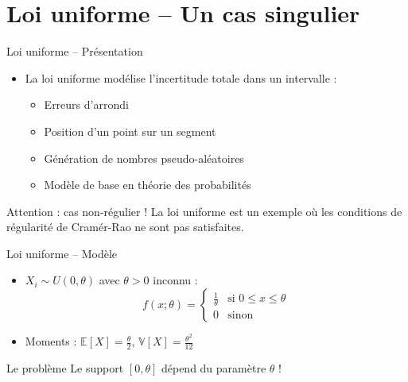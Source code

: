 \documentclass[11pt,aspectratio=169]{beamer}
\begin{document}
\section{Loi uniforme -- Un cas singulier}

\begin{frame}{Loi uniforme -- Présentation}

\begin{itemize}

\item La loi uniforme modélise l'incertitude totale dans un intervalle :\newline
  \begin{itemize}
    \item Erreurs d'arrondi\newline
    \item Position d'un point sur un segment\newline
    \item Génération de nombres pseudo-aléatoires\newline
    \item Modèle de base en théorie des probabilités\newline
  \end{itemize}

\end{itemize}

\begin{alertblock}{Attention : cas non-régulier !}
La loi uniforme est un exemple où les conditions de régularité de Cramér-Rao ne sont pas satisfaites.
\end{alertblock}

\end{frame}

\begin{frame}{Loi uniforme -- Modèle}

\begin{itemize}

\item $X_i \sim U(0, \theta)$ avec $\theta > 0$ inconnu :
  \[
  f(x; \theta) = \begin{cases}
  \frac{1}{\theta} & \text{si } 0 \leq x \leq \theta \\[0.3em]
  0 & \text{sinon}
  \end{cases}
  \]

\item Moments : $\mathbb{E}[X] = \frac{\theta}{2}$, $\mathbb{V}[X] = \frac{\theta^2}{12}$\newline

\end{itemize}

\begin{alertblock}{Le problème}
Le support $[0, \theta]$ dépend du paramètre $\theta$ !
\end{alertblock}

\end{frame}
\end{document}
